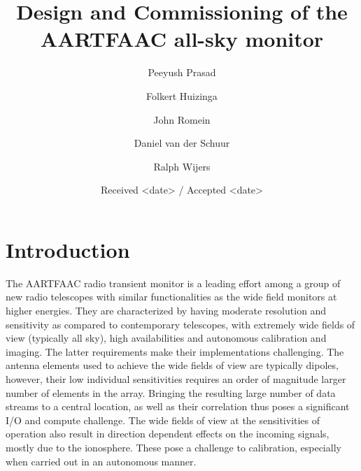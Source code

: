 \documentclass{aa}
\begin{document}
\title{Design and Commissioning of the AARTFAAC all-sky monitor}

\author{Peeyush Prasad   \and Folkert Huizinga  \and John Romein 
\and Daniel van der Schuur  \and Ralph  Wijers  }

\date{Received <date> / Accepted <date>}



\maketitle

\section{\label{sec:Introduction}Introduction}
The AARTFAAC radio  transient monitor is a  leading effort among a  group of new
radio  telescopes with  similar functionalities  as the  wide field  monitors at
higher  energies.  They are  characterized  by  having moderate  resolution  and
sensitivity as compared  to contemporary telescopes, with  extremely wide fields
of view (typically all sky),  high availabilities and autonomous calibration and
imaging.  The  latter requirements  make their implementations  challenging. The
antenna elements used to achieve the  wide fields of view are typically dipoles,
however,  their low  individual  sensitivities requires  an  order of  magnitude
larger number of  elements in the array. Bringing the  resulting large number of
data streams to  a central location, as  well as their correlation  thus poses a
significant  I/O  and  compute  challenge.   The wide  fields  of  view  at  the
sensitivities of  operation also  result in direction  dependent effects  on the
incoming  signals, mostly  due  to the  ionosphere. These  pose  a challenge  to
calibration, especially when carried out in an autonomous manner.
\end{document}
